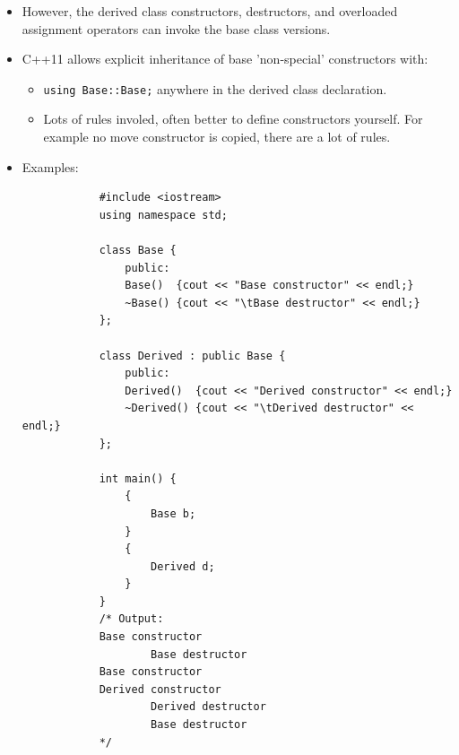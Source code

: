 \begin{itemize}
    \item However, the derived class constructors, destructors, and overloaded assignment operators can invoke the base class versions.
    \item C++11 allows explicit inheritance of base 'non-special' constructors with:
        \begin{itemize}
            \item \texttt{using Base::Base;} anywhere in the derived class declaration.
            \item Lots of rules involed, often better to define constructors yourself. For example no move constructor is copied, there are a lot of rules.
        \end{itemize}
    
    \item Examples:
        \begin{verbatim}
            #include <iostream>
            using namespace std;

            class Base {
                public:
                Base()  {cout << "Base constructor" << endl;}
                ~Base() {cout << "\tBase destructor" << endl;}
            };

            class Derived : public Base {
                public:
                Derived()  {cout << "Derived constructor" << endl;}
                ~Derived() {cout << "\tDerived destructor" << endl;}
            };

            int main() {
                {
                    Base b;
                }
                {
                    Derived d;
                }
            }
            /* Output:
            Base constructor
                    Base destructor
            Base constructor
            Derived constructor
                    Derived destructor
                    Base destructor
            */
        \end{verbatim}
\end{itemize}

